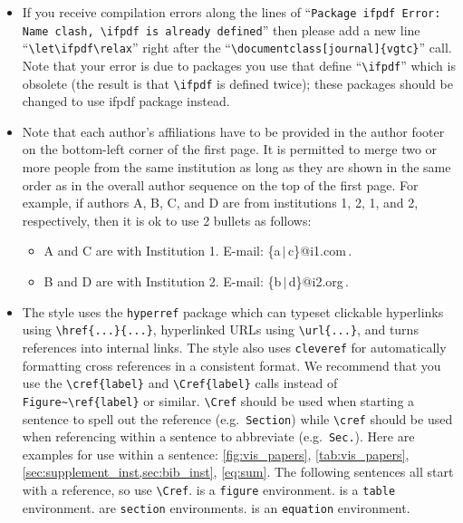 \documentclass[widereview]{vgtc}             %
\begin{document}
\begin{itemize}
	\item If you receive compilation errors along the lines of ``\texttt{Package ifpdf Error: Name clash, \textbackslash ifpdf is already defined}'' then please add a new line ``\texttt{\textbackslash let\textbackslash ifpdf\textbackslash relax}'' right after the ``\texttt{\textbackslash documentclass[journal]\{vgtc\}}'' call.	
		Note that your error is due to packages you use that define ``\texttt{\textbackslash ifpdf}'' which is obsolete (the result is that \texttt{\textbackslash ifpdf} is defined twice); these packages should be changed to use ifpdf package instead.
	
	\item Note that each author's affiliations have to be provided in the author footer on the bottom-left corner of the first page.
		It is permitted to merge two or more people from the same institution as long as they are shown in the same order as in the overall author sequence on the top of the first page.
		For example, if authors A, B, C, and D are from institutions 1, 2, 1, and 2, respectively, then it is ok to use 2 bullets as follows:
		\begin{itemize}		
			\item A and C are with Institution 1. E-mail: \{a\,$|$\,c\}@i1.com\,.
			
			\item B and D are with Institution 2. E-mail: \{b\,$|$\,d\}@i2.org\,.
		\end{itemize}
	
	\item The style uses the \verb|hyperref| package which can typeset clickable hyperlinks using \verb|\href{...}{...}|, hyperlinked URLs using \verb|\url{...}|, and turns references into internal links.
		The style also uses \verb|cleveref| for automatically formatting cross references in a consistent format.
		We recommend that you use the \verb|\cref{label}| and \verb|\Cref{label}| calls instead of \verb|Figure~\ref{label}| or similar.
		\verb|\Cref| should be used when starting a sentence to spell out the reference (e.g.\ \verb|Section|) while \verb|\cref| should be used when referencing within a sentence to abbreviate (e.g.\ \verb|Sec.|).
		Here are examples for use within a sentence: \cref{fig:vis_papers}, \cref{tab:vis_papers}, \cref{sec:supplement_inst,sec:bib_inst}, \cref{eq:sum}.
		The following sentences all start with a reference, so use \verb|\Cref|.
		 is a \verb|figure| environment.
		 is a \verb|table| environment. 
		 are \verb|section| environments.
		 is an \verb|equation| environment.
	

\end{itemize}
\end{document}
